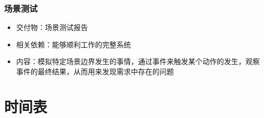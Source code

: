 \documentclass[hyperref, a4paper]{ctexart}
\providecommand{\tightlist}{%
  \setlength{\itemsep}{0pt}\setlength{\parskip}{0pt}}
\begin{document}
\hypertarget{ux573aux666fux6d4bux8bd5}{%
\subsubsection{场景测试}\label{ux573aux666fux6d4bux8bd5}}

\begin{itemize}
\tightlist
\item
  交付物：场景测试报告
\item
  相关依赖：能够顺利工作的完整系统
\item
  内容：模拟特定场景边界发生的事情，通过事件来触发某个动作的发生，观察事件的最终结果，从而用来发现需求中存在的问题
\end{itemize}

\hypertarget{ux65f6ux95f4ux8868}{%
\section{时间表}\label{ux65f6ux95f4ux8868}}
\end{document}
